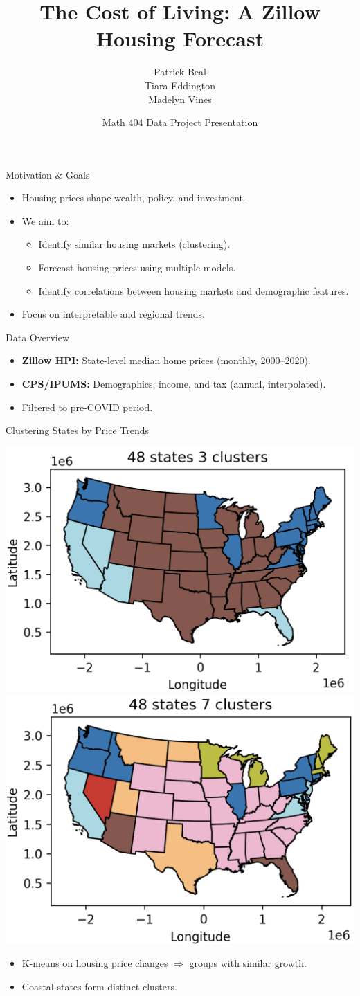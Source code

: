 \documentclass{beamer}
\title[Zillow Housing Forecast]{The Cost of Living: A Zillow Housing Forecast}
\author[Beal, Eddington, Vines]{Patrick Beal \\ Tiara Eddington \\ Madelyn Vines}
\date{Math 404 Data Project Presentation}
\begin{document}
\frame{\titlepage} 

\begin{frame}{Motivation \& Goals}
  \begin{itemize}%
    \item Housing prices shape wealth, policy, and investment.
    \item We aim to:
    \begin{itemize}%
      \item Identify similar housing markets (clustering).
      \item Forecast housing prices using multiple models.
      \item Identify correlations between housing markets and demographic features.
    \end{itemize}
    \item Focus on interpretable and regional trends.
  \end{itemize}
\end{frame}

\begin{frame}{Data Overview} 
  \begin{itemize}%
    \item \textbf{Zillow HPI:} State-level median home prices (monthly, 2000--2020).
    \item \textbf{CPS/IPUMS:} Demographics, income, and tax (annual, interpolated).
    \item Filtered to pre-COVID period.
  \end{itemize}
\end{frame}

\begin{frame}{Clustering States by Price Trends} 
\begin{center}
  \includegraphics[width=0.4\linewidth]{figures/3clusters.png}
  \includegraphics[width=0.4\linewidth]{figures/7clusters.png}
\end{center}
  \begin{itemize}%
    \item K-means on housing price changes $\Rightarrow$ groups with similar growth.
    \item Coastal states form distinct clusters.
  \end{itemize}
\end{frame}
\end{document}
